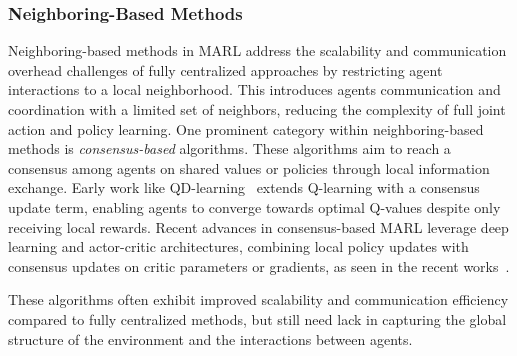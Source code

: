 \documentclass[sigconf]{acmart}
\begin{document}
\subsubsection{Neighboring-Based Methods}
Neighboring-based methods in MARL address the scalability and communication overhead challenges of fully centralized approaches by restricting agent interactions to a local neighborhood. 
This introduces agents communication and coordination with a limited set of neighbors, reducing the complexity of full joint action and policy learning.
%
One prominent category within neighboring-based methods is \emph{consensus-based} algorithms. 
These algorithms aim to reach a consensus among agents on shared values or policies through local information exchange. 
Early work like QD-learning~\cite{kar2012qd} extends Q-learning with a consensus update term, 
enabling agents to converge towards optimal Q-values despite only receiving local rewards.
%  
Recent advances in consensus-based MARL leverage deep learning and actor-critic architectures, 
combining local policy updates with consensus updates on critic parameters or gradients, 
as seen in the recent works~\cite{7434032,pennesi2010distributed,zhang2018fully,DBLP:journals/jmlr/CiosekW20}.

These algorithms often exhibit improved scalability and communication efficiency compared to fully centralized methods, 
but still need lack in capturing the global structure of the environment and the interactions between agents.
\end{document}
